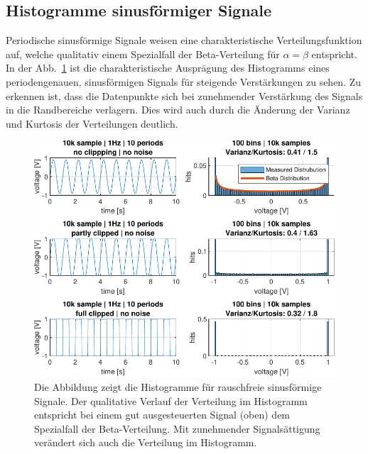 \subsection{Histogramme sinusförmiger Signale }
Periodische sinusförmige Signale weisen eine charakteristische Verteilungsfunktion auf, welche qualitativ einem Spezialfall der Beta-Verteilung für $\alpha = \beta$ entspricht. In der Abb.~\ref{fig:Histogramm-Gain} ist die charakteristische Ausprägung des Histogramms eines periodengenauen, sinusförmigen Signals für steigende Verstärkungen zu sehen. Zu erkennen ist, dass die Datenpunkte sich bei zunehmender Verstärkung des Signals in die Randbereiche verlagern. Dies wird auch durch die Änderung der Varianz und Kurtosis der Verteilungen deutlich.
\begin{figure}[h!] 
	\centering 
	\includegraphics[width=1\columnwidth]{../img/beta-distribution.pdf}
	\caption{Die Abbildung zeigt die Histogramme für rauschfreie sinusförmige Signale. Der qualitative Verlauf der Verteilung im Histogramm entspricht bei einem gut ausgesteuerten Signal (oben) dem Spezialfall der Beta-Verteilung. Mit zunehmender Signalsättigung verändert sich auch die Verteilung im Histogramm.}
	\label{fig:Histogramm-Gain}
\end{figure} 

